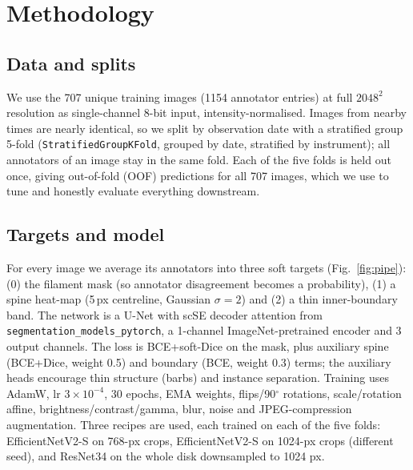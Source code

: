 \documentclass[sigconf]{acmart}
\begin{document}
\section{Methodology}\label{sec:methodology}

\subsection{Data and splits}
We use the 707 unique training images (1154 annotator entries) at full $2048^2$ resolution as single-channel 8-bit input, intensity-normalised. Images from nearby times are nearly identical, so we split by observation date with a stratified group 5-fold (\texttt{StratifiedGroupKFold}, grouped by date, stratified by instrument); all annotators of an image stay in the same fold. Each of the five folds is held out once, giving out-of-fold (OOF) predictions for all 707 images, which we use to tune and honestly evaluate everything downstream.

\subsection{Targets and model}
For every image we average its annotators into three soft targets (Fig.~\ref{fig:pipe}): (0) the filament mask (so annotator disagreement becomes a probability), (1) a spine heat-map (5\,px centreline, Gaussian $\sigma{=}2$) and (2) a thin inner-boundary band. The network is a U-Net \cite{ronneberger2015unet} with scSE decoder attention from \texttt{segmentation\_models\_pytorch}, a 1-channel ImageNet-pretrained encoder and 3 output channels. The loss is BCE+soft-Dice on the mask, plus auxiliary spine (BCE+Dice, weight 0.5) and boundary (BCE, weight 0.3) terms; the auxiliary heads encourage thin structure (barbs) and instance separation. Training uses AdamW, lr $3\!\times\!10^{-4}$, 30 epochs, EMA weights, flips/90$^\circ$ rotations, scale/rotation affine, brightness/contrast/gamma, blur, noise and JPEG-compression augmentation. Three recipes are used, each trained on each of the five folds: EfficientNetV2-S \cite{tan2021efficientnetv2} on 768-px crops, EfficientNetV2-S on 1024-px crops (different seed), and ResNet34 \cite{he2016resnet} on the whole disk downsampled to 1024 px.
\end{document}
